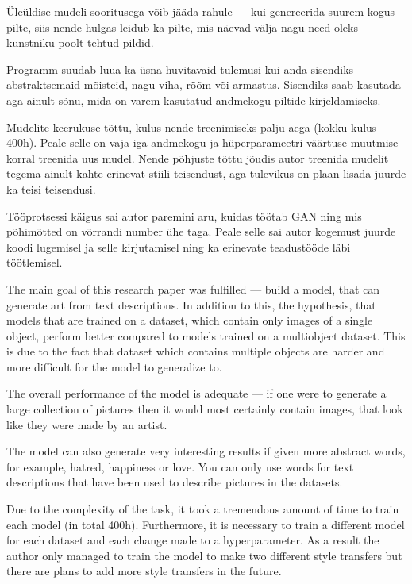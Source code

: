 \documentclass{vilgym}
\begin{document}
	Üleüldise mudeli sooritusega võib jääda rahule --- kui genereerida suurem kogus pilte, siis nende hulgas leidub ka pilte, mis näevad välja nagu need oleks kunstniku poolt tehtud pildid. 

	Programm suudab luua ka üsna huvitavaid tulemusi kui anda sisendiks abstraktsemaid mõisteid, nagu viha, rõõm või armastus. Sisendiks saab kasutada aga ainult sõnu, mida on varem kasutatud andmekogu piltide kirjeldamiseks.
	
	Mudelite keerukuse tõttu, kulus nende treenimiseks palju aega (kokku kulus 400h). Peale selle on vaja iga andmekogu ja hüperparameetri väärtuse muutmise korral treenida uus mudel. Nende põhjuste tõttu jõudis autor treenida mudelit tegema ainult kahte erinevat stiili teisendust, aga tulevikus on plaan lisada juurde ka teisi teisendusi.

	Tööprotsessi käigus sai autor paremini aru, kuidas töötab GAN ning mis põhimõtted on võrrandi number ühe taga. Peale selle sai autor kogemust juurde koodi lugemisel ja selle kirjutamisel ning ka erinevate teadustööde läbi töötlemisel.

    The main goal of this research paper was fulfilled --- build a model, that can generate art from text descriptions. In addition to this, the hypothesis, that models that are trained on a dataset, which contain only images of a single object, perform better compared to models trained on a multiobject dataset. This is due to the fact that dataset which contains multiple objects are harder and more difficult for the model to generalize to.
    
    The overall performance of the model is adequate --- if one were to generate a large collection of pictures then it would most certainly contain images, that look like they were made by an artist.

    The model can also generate very interesting results if given more abstract words, for example, hatred, happiness or love. You can only use words for text descriptions that have been used to describe pictures in the datasets.

    Due to the complexity of the task, it took a tremendous amount of time to train each model (in total 400h). Furthermore, it is necessary to train a different model for each dataset and each change made to a hyperparameter. As a result the author only managed to train the model to make two different style transfers but there are plans to add more style transfers in the future.
    
\end{document}
